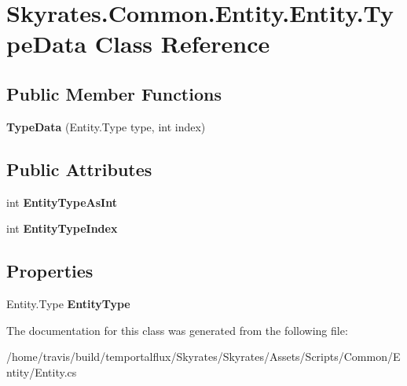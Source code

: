 \hypertarget{class_skyrates_1_1_common_1_1_entity_1_1_entity_1_1_type_data}{\section{Skyrates.\-Common.\-Entity.\-Entity.\-Type\-Data Class Reference}
\label{class_skyrates_1_1_common_1_1_entity_1_1_entity_1_1_type_data}
}
\subsection*{Public Member Functions}
\begin{DoxyCompactItemize}
\item 
\hypertarget{class_skyrates_1_1_common_1_1_entity_1_1_entity_1_1_type_data_a4ef8546f0aeaa4f064e3dd470c202832}{{\bfseries Type\-Data} (Entity.\-Type type, int index)}\label{class_skyrates_1_1_common_1_1_entity_1_1_entity_1_1_type_data_a4ef8546f0aeaa4f064e3dd470c202832}

\end{DoxyCompactItemize}
\subsection*{Public Attributes}
\begin{DoxyCompactItemize}
\item 
\hypertarget{class_skyrates_1_1_common_1_1_entity_1_1_entity_1_1_type_data_ae1d503ba32f705ea1c76887377b9ca41}{int {\bfseries Entity\-Type\-As\-Int}}\label{class_skyrates_1_1_common_1_1_entity_1_1_entity_1_1_type_data_ae1d503ba32f705ea1c76887377b9ca41}

\item 
\hypertarget{class_skyrates_1_1_common_1_1_entity_1_1_entity_1_1_type_data_a11701833c616d61f48c61a0a6d5925a7}{int {\bfseries Entity\-Type\-Index}}\label{class_skyrates_1_1_common_1_1_entity_1_1_entity_1_1_type_data_a11701833c616d61f48c61a0a6d5925a7}

\end{DoxyCompactItemize}
\subsection*{Properties}
\begin{DoxyCompactItemize}
\item 
\hypertarget{class_skyrates_1_1_common_1_1_entity_1_1_entity_1_1_type_data_a77a694c041e70f02ca1bcc12b9244de5}{Entity.\-Type {\bfseries Entity\-Type}}\label{class_skyrates_1_1_common_1_1_entity_1_1_entity_1_1_type_data_a77a694c041e70f02ca1bcc12b9244de5}

\end{DoxyCompactItemize}


The documentation for this class was generated from the following file\-:\begin{DoxyCompactItemize}
\item 
/home/travis/build/temportalflux/\-Skyrates/\-Skyrates/\-Assets/\-Scripts/\-Common/\-Entity/Entity.\-cs\end{DoxyCompactItemize}
